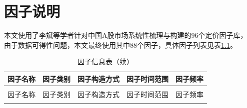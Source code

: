 
\appendix

\chapter{因子说明}

本文使用了李斌等学者\cite{li2019machine}针对中国A股市场系统性梳理与构建的96个定价因子库，
由于数据可得性问题，本文最终使用其中88个因子，具体因子列表见表\ref{tab:factor_info}。


\begin{center}
\scriptsize
\setlength{\LTleft}{\fill}
\setlength{\LTright}{\fill}
\begin{longtable}{>{\centering\arraybackslash}m{}>{\centering\arraybackslash}m{}>{\centering\arraybackslash}m{}>{\centering\arraybackslash}m{}>{\centering\arraybackslash}m{}}
    \caption{因子信息表}\label{tab:factor_info}\\
    \toprule
    因子名称  & 因子类别 & 因子构造方式 & 因子时间范围 & 因子频率 \\
    \midrule
    \endfirsthead

    \caption[]{因子信息表（续）}\\
    \toprule
    因子名称  & 因子类别 & 因子构造方式 & 因子时间范围 & 因子频率 \\
    \midrule
    \endhead

    \bottomrule
    \endfoot

    \bottomrule
    \endlastfoot


\end{longtable}
\end{center}
